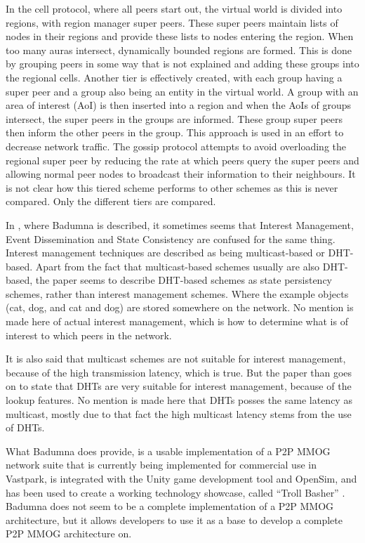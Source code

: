 \documentclass[journal,oneside,a4paper,onecolumn]{IEEEtran}
\begin{document}
In the cell protocol, where all peers start out, the virtual world is divided into regions, with region manager super peers. These super peers maintain lists of nodes in their regions and provide these lists to nodes entering the region. When too many auras intersect, dynamically bounded regions are formed. This is done by grouping peers in some way that is not explained and adding these groups into the regional cells. Another tier is effectively created, with each group having a super peer and a group also being an entity in the virtual world. A group with an area of interest (AoI) is then inserted into a region and when the AoIs of groups intersect, the super peers in the groups are informed. These group super peers then inform the other peers in the group. This approach is used in an effort to decrease network traffic. The gossip protocol attempts to avoid overloading the regional super peer by reducing the rate at which peers query the super peers and allowing normal peer nodes to broadcast their information to their neighbours. It is not clear how this tiered scheme performs to other schemes as this is never compared. Only the different tiers are compared.

In \cite{badumna_engine}, where Badumna is described, it sometimes seems that Interest Management, Event Dissemination and State Consistency are confused for the same thing. Interest management techniques are described as being multicast-based or DHT-based. Apart from the fact that multicast-based schemes usually are also DHT-based, the paper seems to describe DHT-based schemes as state persistency schemes, rather than interest management schemes. Where the example objects (cat, dog, and cat and dog) are stored somewhere on the network. No mention is made here of actual interest management, which is how to determine what is of interest to which peers in the network.

It is also said that multicast schemes are not suitable for interest management, because of the high transmission latency, which is true. But the paper than goes on to state that DHTs are very suitable for interest management, because of the lookup features. No mention is made here that DHTs posses the same latency as multicast, mostly due to that fact the high multicast latency stems from the use of DHTs.

What Badumna does provide, is a usable implementation of a P2P MMOG network suite that is currently being implemented for commercial use in Vastpark, is integrated with the Unity game development tool and OpenSim, and has been used to create a working technology showcase, called ``Troll Basher'' \cite{badumna_showcase}. Badumna does not seem to be a complete implementation of a P2P MMOG architecture, but it allows developers to use it as a base to develop a complete P2P MMOG architecture on.
\end{document}
